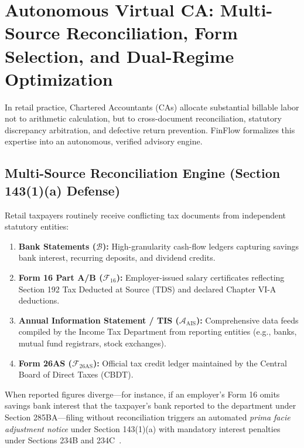 \documentclass[conference]{IEEEtran}
\begin{document}
\section{Autonomous Virtual CA: Multi-Source Reconciliation, Form Selection, and Dual-Regime Optimization}
\label{sec:virtual_ca}
In retail practice, Chartered Accountants (CAs) allocate substantial billable labor not to arithmetic calculation, but to cross-document reconciliation, statutory discrepancy arbitration, and defective return prevention. FinFlow formalizes this expertise into an autonomous, verified advisory engine.

\subsection{Multi-Source Reconciliation Engine (Section 143(1)(a) Defense)}
Retail taxpayers routinely receive conflicting tax documents from independent statutory entities:
\begin{enumerate}
    \item \textbf{Bank Statements ($\mathcal{B}$):} High-granularity cash-flow ledgers capturing savings bank interest, recurring deposits, and dividend credits.
    \item \textbf{Form 16 Part A/B ($\mathcal{F}_{16}$):} Employer-issued salary certificates reflecting Section 192 Tax Deducted at Source (TDS) and declared Chapter VI-A deductions.
    \item \textbf{Annual Information Statement / TIS ($\mathcal{A}_{\text{AIS}}$):} Comprehensive data feeds compiled by the Income Tax Department from reporting entities (e.g., banks, mutual fund registrars, stock exchanges).
    \item \textbf{Form 26AS ($\mathcal{F}_{26\text{AS}}$):} Official tax credit ledger maintained by the Central Board of Direct Taxes (CBDT).
\end{enumerate}

When reported figures diverge—for instance, if an employer's Form 16 omits savings bank interest that the taxpayer's bank reported to the department under Section 285BA—filing without reconciliation triggers an automated \textit{prima facie adjustment notice} under Section 143(1)(a) with mandatory interest penalties under Sections 234B and 234C~\cite{incometaxact1961}.
\end{document}
